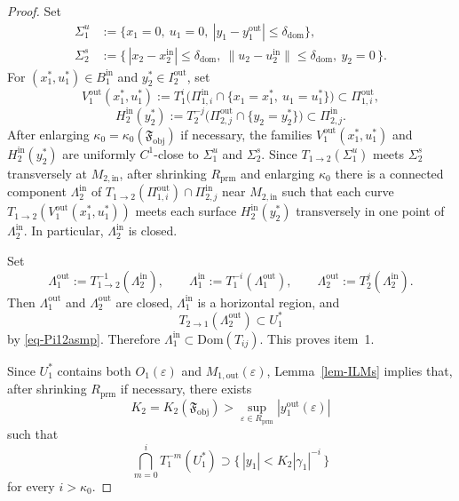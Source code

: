 \documentclass[11pt,a4paper]{article}
\theoremstyle{plain}
\theoremstyle{definition}
\theoremstyle{plain}
\numberwithin{equation}{section}
\begin{document}
\begin{proof}
Set
\begin{align*}
\Sigma_1^u
&:=
\{x_1 = 0,\ u_1 = 0,\ |y_1 - y_1^\mathrm{out}| \le \delta_\mathrm{dom}\},
\\
\Sigma_2^s
&:=
\{\,|x_2 - x_2^\mathrm{in}| \le \delta_\mathrm{dom},\ \|u_2 - u_2^\mathrm{in}\| \le \delta_\mathrm{dom},\ y_2 = 0\,\}.
\end{align*}
For $(x_1^*,u_1^*) \in B_1^\mathrm{in}$ and $y_2^* \in I_2^\mathrm{out}$, set
\[
V_1^\mathrm{out}(x_1^*,u_1^*)
:=
T_1^i\bigl(\Pi_{1,i}^\mathrm{in} \cap \{x_1 = x_1^*,\ u_1 = u_1^*\}\bigr)
\subset
\Pi_{1,i}^\mathrm{out},
\]
\[
H_2^\mathrm{in}(y_2^*)
:=
T_2^{-j}\bigl(\Pi_{2,j}^\mathrm{out} \cap \{y_2 = y_2^*\}\bigr)
\subset
\Pi_{2,j}^\mathrm{in}.
\]
After enlarging $\kappa_0 = \kappa_0(\mathfrak{F}_\mathrm{obj})$ if necessary, the families $V_1^\mathrm{out}(x_1^*,u_1^*)$ and $H_2^\mathrm{in}(y_2^*)$ are uniformly $C^1$-close to $\Sigma_1^u$ and $\Sigma_2^s$. Since $T_{1 \to 2}(\Sigma_1^u)$ meets $\Sigma_2^s$ transversely at $M_{2,\mathrm{in}}$, after shrinking $R_\mathrm{prm}$ and enlarging $\kappa_0$ there is a connected component $\Lambda_2^\mathrm{in}$ of $T_{1 \to 2}(\Pi_{1,i}^\mathrm{out}) \cap \Pi_{2,j}^\mathrm{in}$ near $M_{2,\mathrm{in}}$ such that each curve $T_{1 \to 2}(V_1^\mathrm{out}(x_1^*,u_1^*))$ meets each surface $H_2^\mathrm{in}(y_2^*)$ transversely in one point of $\Lambda_2^\mathrm{in}$. In particular, $\Lambda_2^\mathrm{in}$ is closed.

Set
\[
\Lambda_1^\mathrm{out} := T_{1 \to 2}^{-1}(\Lambda_2^\mathrm{in}),
\qquad
\Lambda_1^\mathrm{in} := T_1^{-i}(\Lambda_1^\mathrm{out}),
\qquad
\Lambda_2^\mathrm{out} := T_2^j(\Lambda_2^\mathrm{in}).
\]
Then $\Lambda_1^\mathrm{out}$ and $\Lambda_2^\mathrm{out}$ are closed, $\Lambda_1^\mathrm{in}$ is a horizontal region, and
\[
T_{2 \to 1}(\Lambda_2^\mathrm{out}) \subset U_1^*
\]
by \eqref{eq-Pi12asmp}.
Therefore $\Lambda_1^\mathrm{in} \subset \mathrm{Dom}(T_{ij})$. This proves item~1.

Since $U_1^*$ contains both $O_1(\varepsilon)$ and $M_{1,\mathrm{out}}(\varepsilon)$, Lemma~\ref{lem-ILMs} implies that, after shrinking $R_\mathrm{prm}$ if necessary, there exists
\[
K_2 = K_2(\mathfrak{F}_\mathrm{obj}) > \sup_{\varepsilon \in R_\mathrm{prm}} |y_1^\mathrm{out}(\varepsilon)|
\]
such that
\[
\bigcap_{m = 0}^i T_1^{-m}(U_1^*)
\supset
\{\,|y_1| < K_2|\gamma_1|^{-i}\,\}
\]
for every $i > \kappa_0$.


\end{proof}
\end{document}
